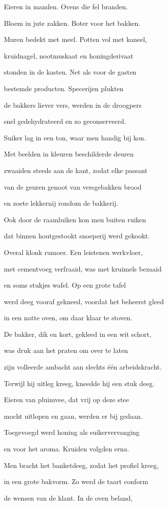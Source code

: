 Eieren in manden.
Ovens die fel branden.

Bloem in jute zakken.
Boter voor het bakken.

Muren bedekt met meel.
Potten vol met kaneel,

kruidnagel, nootmuskaat
en honingderivaat

stonden in de kasten.
Net als voor de gasten

bestemde producten.
Specerijen plukten

de bakkers liever vers,
werden in de droogpers

snel gedehydrateerd
en zo geconserveerd.

Suiker lag in een ton,
waar men handig bij kon.

Met beelden in kleuren
beschilderde deuren

zwaaiden steeds aan de kant,
zodat elke passant

van de geuren genoot
van versgebakken brood

en zoete lekkernij
rondom de bakkerij.

Ook door de raamluiken
kon men buiten ruiken

dat binnen houtgestookt
snoeperij werd gekookt.

Overal klonk rumoer.
Een leistenen werkvloer,

met cementvoeg verfraaid,
was met kruimels bezaaid

en soms stukjes wafel.
Op een grote tafel

werd deeg vooraf gekneed,
voordat het beheerst gleed

in een natte oven,
om daar klaar te stoven.

De bakker, dik en kort,
gekleed in een wit schort,

was druk aan het praten
om over te laten

zijn volleerde ambacht
aan slechts één arbeidskracht.

Terwijl hij uitleg kreeg,
kneedde hij een stuk deeg.

Eieren van pluimvee,
dat vrij op deze stee

mocht uitlopen en gaan,
werden er bij gedaan.

Toegevoegd werd honing
als suikervervanging

en voor het aroma.
Kruiden volgden erna.

Men bracht het banketdeeg,
zodat het profiel kreeg,

in een grote bakvorm.
Zo werd de taart conform

de wensen van de klant.
In de oven beland,

